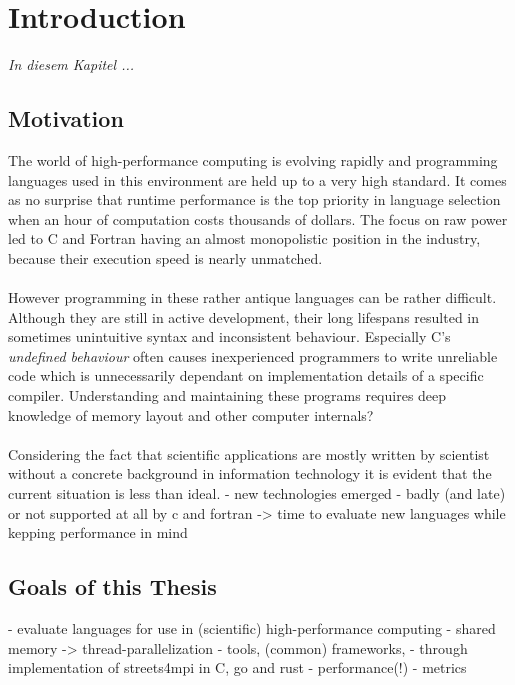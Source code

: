 \chapter{Introduction}
\label{chap:Introduction}

\textit{%
In diesem Kapitel ...
}
\bigskip

\section{Motivation}
\label{sec:Motivation}

The world of high-performance computing is evolving rapidly and programming languages used in this environment are held up to a very high standard. It comes as no surprise that runtime performance is the top priority in language selection when an hour of computation costs thousands of dollars. The focus on raw power led to C and Fortran having an almost monopolistic position in the industry, because their execution speed is nearly unmatched.
\\ \\
However programming in these rather antique languages can be rather difficult. Although they are still in active development, their long lifespans resulted in sometimes unintuitive syntax and inconsistent behaviour. Especially C's \textit{undefined behaviour} often causes inexperienced programmers to write unreliable code which is unnecessarily dependant on implementation details of a specific compiler. Understanding and maintaining these programs requires deep knowledge of memory layout and other computer internals?
\\ \\
Considering the fact that scientific applications are mostly written by scientist without a concrete background in information technology it is evident that the current situation is less than ideal.
- new technologies emerged
    - badly (and late) or not supported at all by c and fortran
    -> time to evaluate new languages while kepping performance in mind

\section{Goals of this Thesis}
\label{sec:Goals}

- evaluate languages for use in (scientific) high-performance computing
    - shared memory -> thread-parallelization
    - tools, (common) frameworks,
- through implementation of streets4mpi in C, go and rust
    - performance(!)
    - metrics
